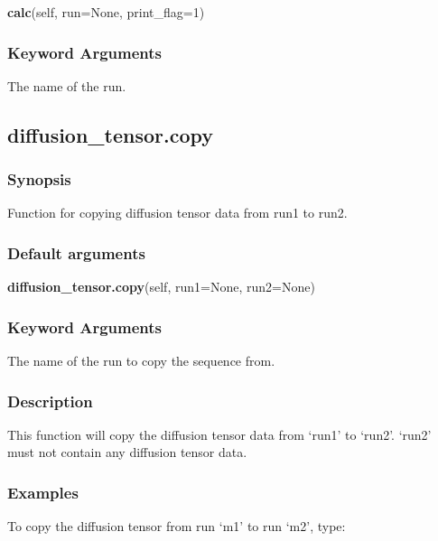 \textsf{\textbf{calc}(self, run=None, print\_flag=1)}


\subsubsection{Keyword Arguments}

  The name of the run.


\newpage

\subsection{diffusion\_tensor.copy}


\subsubsection{Synopsis}

Function for copying diffusion tensor data from run1 to run2.

\subsubsection{Default arguments}

\textsf{\textbf{diffusion\_tensor.copy}(self, run1=None, run2=None)}


\subsubsection{Keyword Arguments}

  The name of the run to copy the sequence from.


\subsubsection{Description}

This function will copy the diffusion tensor data from `run1' to `run2'.  `run2' must not
contain any diffusion tensor data.


\subsubsection{Examples}

To copy the diffusion tensor from run `m1' to run `m2', type:




\newpage

